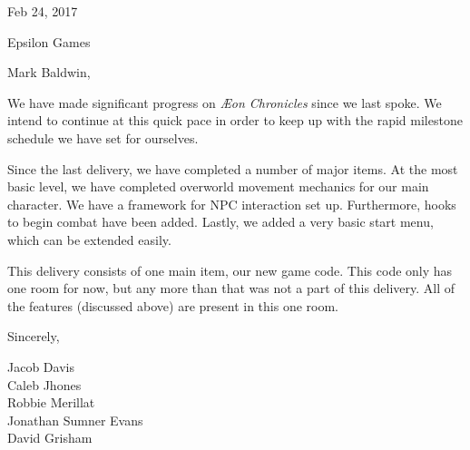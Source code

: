 \documentclass[12pt]{article}
\newcommand\tab[1][.5in]{\hspace*{#1}}
\begin{document}
\hfill Feb 24, 2017

\hfill Epsilon Games

Mark Baldwin,

We have made significant progress on \textit{{\AE}on Chronicles} since we last
spoke. We intend to continue at this quick pace in order to keep up with the
rapid milestone schedule we have set for ourselves.

Since the last delivery, we have completed a number of major items. At the most
basic level, we have completed overworld movement mechanics for our main
character. We have a framework for NPC interaction set up. Furthermore, hooks
to begin combat have been added. Lastly, we added a very basic start menu, which
can be extended easily.

This delivery consists of one main item, our new game code. This code only has
one room for now, but any more than that was not a part of this delivery. All of
the features (discussed above) are present in this one room.

Sincerely,

\tab Jacob Davis \\
\tab Caleb Jhones \\
\tab Robbie Merillat \\
\tab Jonathan Sumner Evans \\
\tab David Grisham \\
\end{document}
